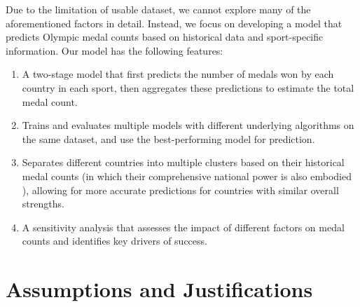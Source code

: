 \documentclass{mcmthesis}
\begin{document}
Due to the limitation of usable dataset, we cannot explore many of the aforementioned factors in detail. Instead, we focus on developing a model that predicts Olympic medal counts based on historical data and sport-specific information. Our model has the following features:

\begin{enumerate}
    \item A two-stage model that first predicts the number of medals won by each country in each sport, then aggregates these predictions to estimate the total medal count.
    \item Trains and evaluates multiple models with different underlying algorithms on the same dataset, and use the best-performing model for prediction.
    \item Separates different countries into multiple clusters based on their historical medal counts (in which their comprehensive national power is also embodied \cite{7}), allowing for more accurate predictions for countries with similar overall strengths.
    \item A sensitivity analysis that assesses the impact of different factors on medal counts and identifies key drivers of success. 
\end{enumerate}

\section{Assumptions and Justifications} 
\end{document}
